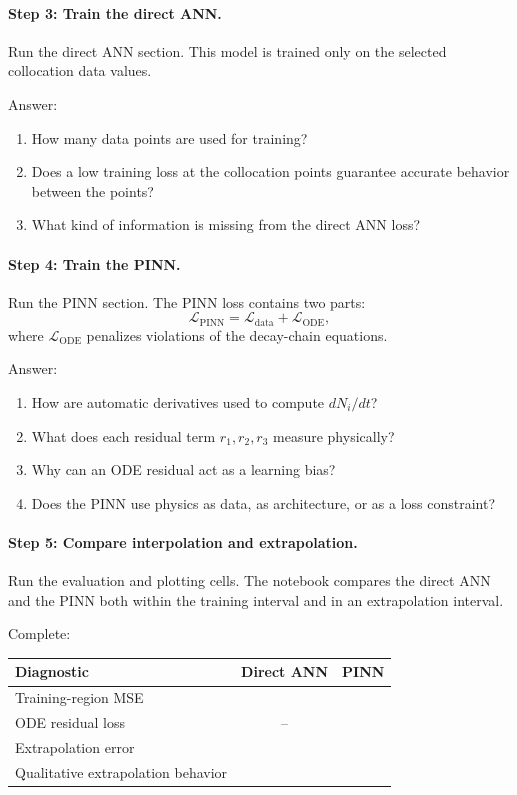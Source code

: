 \paragraph{Step 3: Train the direct ANN.}
Run the direct ANN section. This model is trained only on the selected collocation data values.

Answer:
\begin{enumerate}
    \item How many data points are used for training?
    \item Does a low training loss at the collocation points guarantee accurate behavior between the points?
    \item What kind of information is missing from the direct ANN loss?
\end{enumerate}

\paragraph{Step 4: Train the PINN.}
Run the PINN section. The PINN loss contains two parts:
\[
\mathcal{L}_{\mathrm{PINN}}
=
\mathcal{L}_{\mathrm{data}}
+
\mathcal{L}_{\mathrm{ODE}},
\]
where \(\mathcal{L}_{\mathrm{ODE}}\) penalizes violations of the decay-chain equations.

Answer:
\begin{enumerate}
    \item How are automatic derivatives used to compute \(dN_i/dt\)?
    \item What does each residual term \(r_1,r_2,r_3\) measure physically?
    \item Why can an ODE residual act as a learning bias?
    \item Does the PINN use physics as data, as architecture, or as a loss constraint?
\end{enumerate}

\paragraph{Step 5: Compare interpolation and extrapolation.}
Run the evaluation and plotting cells. The notebook compares the direct ANN and the PINN both within the training interval and in an extrapolation interval.

Complete:
\begin{center}
\begin{tabular}{l c c}
\hline
Diagnostic & Direct ANN & PINN \\
\hline
Training-region MSE & & \\
ODE residual loss & -- & \\
Extrapolation error & & \\
Qualitative extrapolation behavior & & \\
\hline
\end{tabular}
\end{center}

